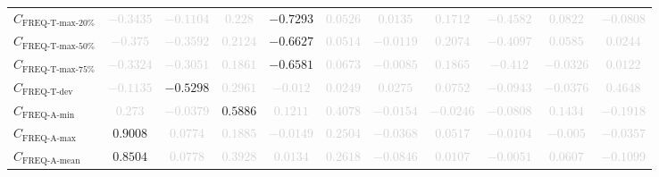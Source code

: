\documentclass{standalone}
\newcommand{\freqmaxtwentyname}{\text{FREQ-T-max-20\%}}
\newcommand{\freqmaxtwenty}{C_{\freqmaxtwentyname}}
\newcommand{\freqmaxfiftyname}{\text{FREQ-T-max-50\%}}
\newcommand{\freqmaxfifty}{C_{\freqmaxfiftyname}}
\newcommand{\freqmaxseventyfivename}{\text{FREQ-T-max-75\%}}
\newcommand{\freqmaxseventyfive}{C_{\freqmaxseventyfivename}}
\newcommand{\freqdevname}{\text{FREQ-T-dev}}
\newcommand{\freqdev}{C_{\freqdevname}}
\newcommand{\actfreqminname}{\text{FREQ-A-min}}
\newcommand{\actfreqmin}{C_{\actfreqminname}}
\newcommand{\actfreqmaxname}{\text{FREQ-A-max}}
\newcommand{\actfreqmax}{C_{\actfreqmaxname}}
\newcommand{\actfreqmeanname}{\text{FREQ-A-mean}}
\newcommand{\actfreqmean}{C_{\actfreqmeanname}}
\begin{document}
\begin{tabular}{lcccccccccc}
$\freqmaxtwenty$ & \textcolor{lightgray}{$-0.3435$} & \textcolor{lightgray}{$-0.1104$} & \textcolor{lightgray}{$0.228$} & $-0.7293$ & \textcolor{lightgray}{$0.0526$} & \textcolor{lightgray}{$0.0135$} & \textcolor{lightgray}{$0.1712$} & \textcolor{lightgray}{$-0.4582$} & \textcolor{lightgray}{$0.0822$} & \textcolor{lightgray}{$-0.0808$} \\ 
$\freqmaxfifty$ & \textcolor{lightgray}{$-0.375$} & \textcolor{lightgray}{$-0.3592$} & \textcolor{lightgray}{$0.2124$} & $-0.6627$ & \textcolor{lightgray}{$0.0514$} & \textcolor{lightgray}{$-0.0119$} & \textcolor{lightgray}{$0.2074$} & \textcolor{lightgray}{$-0.4097$} & \textcolor{lightgray}{$0.0585$} & \textcolor{lightgray}{$0.0244$} \\ 
$\freqmaxseventyfive$ & \textcolor{lightgray}{$-0.3324$} & \textcolor{lightgray}{$-0.3051$} & \textcolor{lightgray}{$0.1861$} & $-0.6581$ & \textcolor{lightgray}{$0.0673$} & \textcolor{lightgray}{$-0.0085$} & \textcolor{lightgray}{$0.1865$} & \textcolor{lightgray}{$-0.412$} & \textcolor{lightgray}{$-0.0326$} & \textcolor{lightgray}{$0.0122$} \\ 
$\freqdev$ & \textcolor{lightgray}{$-0.1135$} & $-0.5298$ & \textcolor{lightgray}{$0.2961$} & \textcolor{lightgray}{$-0.012$} & \textcolor{lightgray}{$0.0249$} & \textcolor{lightgray}{$0.0275$} & \textcolor{lightgray}{$0.0752$} & \textcolor{lightgray}{$-0.0943$} & \textcolor{lightgray}{$-0.0376$} & \textcolor{lightgray}{$0.4648$} \\ 
$\actfreqmin$ & \textcolor{lightgray}{$0.273$} & \textcolor{lightgray}{$-0.0379$} & $0.5886$ & \textcolor{lightgray}{$0.1211$} & \textcolor{lightgray}{$0.4078$} & \textcolor{lightgray}{$-0.0154$} & \textcolor{lightgray}{$-0.0246$} & \textcolor{lightgray}{$-0.0808$} & \textcolor{lightgray}{$0.1434$} & \textcolor{lightgray}{$-0.1918$} \\ 
$\actfreqmax$ & $0.9008$ & \textcolor{lightgray}{$0.0774$} & \textcolor{lightgray}{$0.1885$} & \textcolor{lightgray}{$-0.0149$} & \textcolor{lightgray}{$0.2504$} & \textcolor{lightgray}{$-0.0368$} & \textcolor{lightgray}{$0.0517$} & \textcolor{lightgray}{$-0.0104$} & \textcolor{lightgray}{$-0.005$} & \textcolor{lightgray}{$-0.0357$} \\ 
$\actfreqmean$ & $0.8504$ & \textcolor{lightgray}{$0.0778$} & \textcolor{lightgray}{$0.3928$} & \textcolor{lightgray}{$0.0134$} & \textcolor{lightgray}{$0.2618$} & \textcolor{lightgray}{$-0.0846$} & \textcolor{lightgray}{$0.0107$} & \textcolor{lightgray}{$-0.0051$} & \textcolor{lightgray}{$0.0607$} & \textcolor{lightgray}{$-0.1099$} \\ 

\end{tabular}
\end{document}

